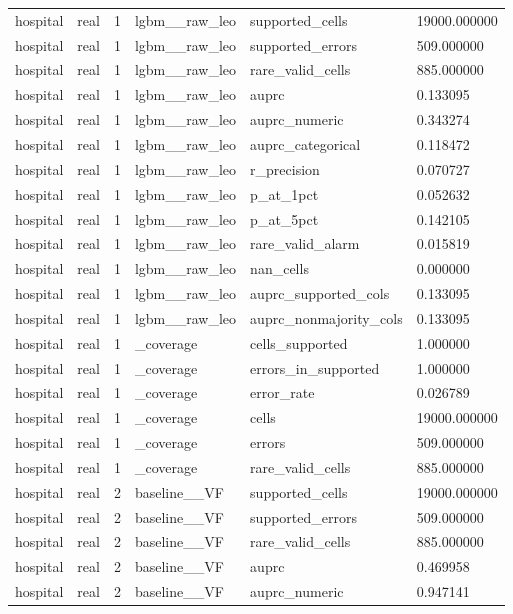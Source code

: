 \begin{tabular}{llllll}
hospital & real & 1 & lgbm\_\_raw\_leo & supported\_cells & 19000.000000 \\
hospital & real & 1 & lgbm\_\_raw\_leo & supported\_errors & 509.000000 \\
hospital & real & 1 & lgbm\_\_raw\_leo & rare\_valid\_cells & 885.000000 \\
hospital & real & 1 & lgbm\_\_raw\_leo & auprc & 0.133095 \\
hospital & real & 1 & lgbm\_\_raw\_leo & auprc\_numeric & 0.343274 \\
hospital & real & 1 & lgbm\_\_raw\_leo & auprc\_categorical & 0.118472 \\
hospital & real & 1 & lgbm\_\_raw\_leo & r\_precision & 0.070727 \\
hospital & real & 1 & lgbm\_\_raw\_leo & p\_at\_1pct & 0.052632 \\
hospital & real & 1 & lgbm\_\_raw\_leo & p\_at\_5pct & 0.142105 \\
hospital & real & 1 & lgbm\_\_raw\_leo & rare\_valid\_alarm & 0.015819 \\
hospital & real & 1 & lgbm\_\_raw\_leo & nan\_cells & 0.000000 \\
hospital & real & 1 & lgbm\_\_raw\_leo & auprc\_supported\_cols & 0.133095 \\
hospital & real & 1 & lgbm\_\_raw\_leo & auprc\_nonmajority\_cols & 0.133095 \\
hospital & real & 1 & \_coverage & cells\_supported & 1.000000 \\
hospital & real & 1 & \_coverage & errors\_in\_supported & 1.000000 \\
hospital & real & 1 & \_coverage & error\_rate & 0.026789 \\
hospital & real & 1 & \_coverage & cells & 19000.000000 \\
hospital & real & 1 & \_coverage & errors & 509.000000 \\
hospital & real & 1 & \_coverage & rare\_valid\_cells & 885.000000 \\
hospital & real & 2 & baseline\_\_VF & supported\_cells & 19000.000000 \\
hospital & real & 2 & baseline\_\_VF & supported\_errors & 509.000000 \\
hospital & real & 2 & baseline\_\_VF & rare\_valid\_cells & 885.000000 \\
hospital & real & 2 & baseline\_\_VF & auprc & 0.469958 \\
hospital & real & 2 & baseline\_\_VF & auprc\_numeric & 0.947141 \\

\end{tabular}
